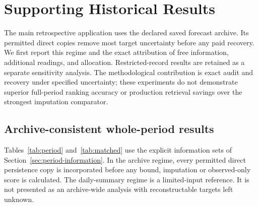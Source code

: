 \documentclass[12pt]{article}
\begin{document}
\FloatBarrier
\section{Supporting Historical Results}\label{app:historical-results}
The main retrospective application uses the declared saved forecast archive.
Its permitted direct copies remove most target uncertainty before any paid
recovery. We first report this regime and the exact attribution of free
information, additional readings, and allocation. Restricted-record results
are retained as a separate sensitivity analysis. The methodological
contribution is exact audit and recovery under specified uncertainty;
these experiments do not demonstrate superior full-period ranking accuracy
or production retrieval savings over the strongest imputation comparator.
\subsection{Archive-consistent whole-period results}
\label{sec:period-results}
Tables~\ref{tab:period} and~\ref{tab:matched} use the explicit information
sets of Section~\ref{sec:period-information}. In the archive regime,
every permitted direct persistence copy is incorporated before any bound,
imputation or observed-only score is calculated. The daily-summary regime
is a limited-input reference. It is not presented as an archive-wide
analysis with reconstructable targets left unknown.
\end{document}
